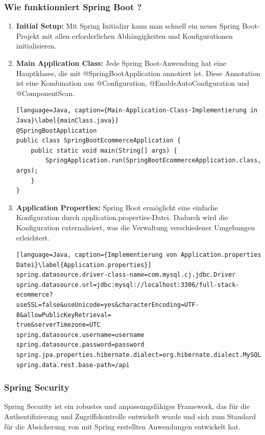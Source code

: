 \subsubsection{Wie funktionniert Spring Boot ?}

\begin{enumerate}
	\item \textbf{Initial Setup:} Mit Spring Initializr kann man schnell ein neues Spring Boot-Projekt mit allen erforderlichen Abhängigkeiten und Konfigurationen initialisieren.
	\item \textbf{Main Application Class:} Jede Spring Boot-Anwendung hat eine Hauptklasse, die mit @SpringBootApplication annotiert ist. Diese Annotation ist eine Kombination aus @Configuration, @EnableAutoConfiguration und @ComponentScan.
	\begin{lstlisting}[language=Java, caption={Main-Application-Class-Implementierung in Java}\label{mainClass.java}]
@SpringBootApplication
public class SpringBootEcommerceApplication {	
	public static void main(String[] args) {
		SpringApplication.run(SpringBootEcommerceApplication.class, args);
	}
}		
	\end{lstlisting}
	\item \textbf{Application Properties:} Spring Boot ermöglicht eine einfache Konfiguration durch application.properties-Datei. Dadurch wird die Konfiguration externalisiert, was die Verwaltung verschiedener Umgebungen erleichtert.
	\begin{lstlisting}[language=Java, caption={Implementierung von Application.properties Datei}\label{Application.properties}]
spring.datasource.driver-class-name=com.mysql.cj.jdbc.Driver
spring.datasource.url=jdbc:mysql://localhost:3306/full-stack-ecommerce?
useSSL=false&useUnicode=yes&characterEncoding=UTF-8&allowPublicKeyRetrieval=
true&serverTimezone=UTC
spring.datasource.username=username
spring.datasource.password=password
spring.jpa.properties.hibernate.dialect=org.hibernate.dialect.MySQL8Dialect
spring.data.rest.base-path=/api
	\end{lstlisting}
\end{enumerate}

\subsubsection{Spring Security}

Spring Security ist ein robustes und anpassungsfähiges Framework, das für die Authentifizierung und Zugriffskontrolle entwickelt wurde und sich zum Standard für die Absicherung von mit Spring erstellten Anwendungen entwickelt hat.

